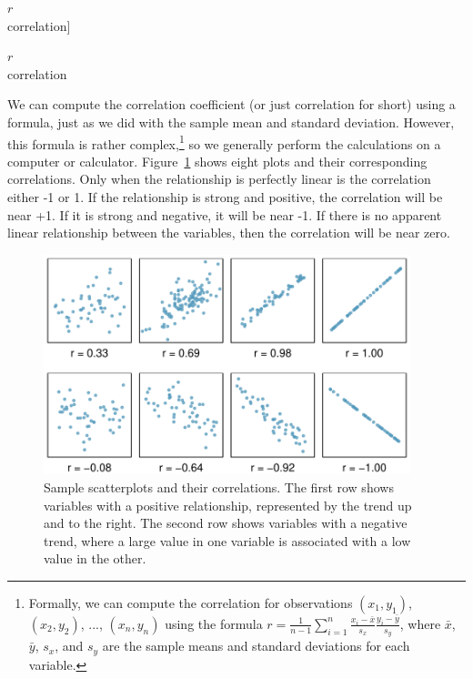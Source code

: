 $r$\\\footnotesize correlation]{\raggedright\vspace{-11.5mm}

$r$\\\footnotesize correlation}

We can compute the correlation coefficient (or just correlation for short) using a formula, just as we did with the sample mean and standard deviation. However, this formula is rather complex,\footnote{Formally, we can compute the correlation for observations $(x_1, y_1)$, $(x_2, y_2)$, ..., $(x_n, y_n)$ using the formula
$r = \frac{1}{n-1}\sum_{i=1}^{n} \frac{x_i-\bar{x}}{s_x}\frac{y_i-\bar{y}}{s_y}$, 
where $\bar{x}$, $\bar{y}$, $s_x$, and $s_y$ are the sample means and standard deviations for each variable.} so we generally perform the calculations on a computer or calculator. Figure~\ref{posNegCorPlots} shows eight plots and their corresponding correlations. Only when the relationship is perfectly linear is the correlation either -1 or 1. If the relationship is strong and positive, the correlation will be near +1. If it is strong and negative, it will be near -1. If there is no apparent linear relationship between the variables, then the correlation will be near zero.

\begin{figure}
   \centering
   \includegraphics[width=0.95\textwidth]{ch_regr_simple_linear/figures/posNegCorPlots/posNegCorPlots}
   \caption{Sample scatterplots and their correlations. The first row shows variables with a positive relationship, represented by the trend up and to the right. The second row shows variables with a negative trend, where a large value in one variable is associated with a low value in the other.}
   \label{posNegCorPlots}
\end{figure}

